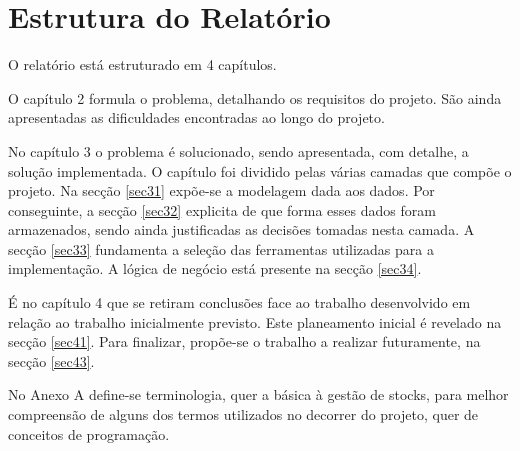 %
%
\section{Estrutura do Relatório} \label{sec14}
O relatório está estruturado em 4 capítulos.

O capítulo 2 formula o problema, detalhando os requisitos do projeto. São ainda apresentadas as dificuldades encontradas ao longo do projeto. 

No capítulo 3 o problema é solucionado, sendo apresentada, com detalhe, a solução implementada. O capítulo foi dividido pelas várias camadas que compõe o projeto. Na secção \ref{sec31} expõe-se a modelagem dada aos dados. Por conseguinte, a secção \ref{sec32} explicita de que forma esses dados foram armazenados, sendo ainda justificadas as decisões tomadas nesta camada. A secção \ref{sec33} fundamenta a seleção das ferramentas utilizadas para a implementação. A lógica de negócio está presente na secção \ref{sec34}. 

É no capítulo 4 que se retiram conclusões face ao trabalho desenvolvido em relação ao trabalho inicialmente previsto. Este planeamento inicial é revelado na secção \ref{sec41}. Para finalizar, propõe-se o trabalho a realizar futuramente, na secção \ref{sec43}.

No Anexo A define-se terminologia, quer a básica à gestão de stocks, para melhor compreensão de alguns dos termos utilizados no decorrer do projeto, quer de conceitos de programação.
